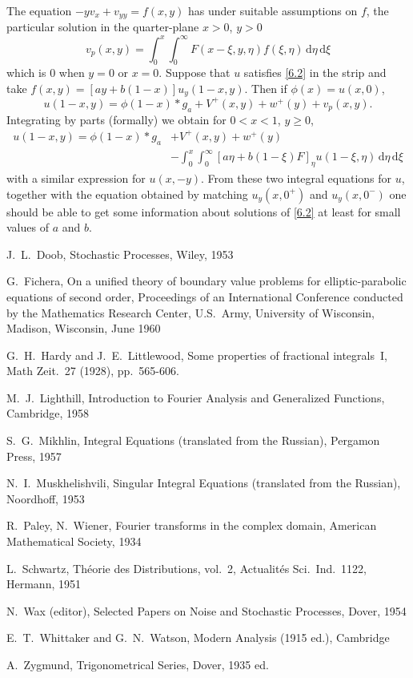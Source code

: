 \documentclass[leqno]{article}
\numberwithin{equation}{section}
\theoremstyle{plain}
\newcommand{\dd}{\,\mathrm{d}}
\begin{document}
The equation $-yv_x+v_{yy}=f(x,y)$ has under suitable assumptions on $f$, the particular solution in the quarter-plane $x > 0$, $y> 0$
\begin{equation*}
	v_p(x,y) = \int_0^x \int_0^\infty F(x-\xi,y,\eta) f(\xi,\eta) \dd \eta \dd \xi
\end{equation*}
which is $0$ when $y = 0$ or $x = 0$.
Suppose that $u$ satisfies \eqref{6.2} in the strip and take $f(x,y) = [ay + b(1-x)] u_y(1-x,y)$.
Then if $\phi(x)=u(x,0)$,
\begin{equation*}
	u(1-x,y) = \phi(1-x) * g_a + V^+(x,y) + w^+(y) + v_p(x,y).
\end{equation*}
Integrating by parts (formally) we obtain for $0 < x < 1$, $y \geq 0$,
\begin{equation*}
	\begin{split}
		u(1-x,y) = \phi(1-x) * g_a & + V^+(x,y) + w^+(y) \\
		& - \int_0^x \int_0^\infty [a\eta+b(1-\xi)F]_\eta u(1-\xi,\eta) \dd \eta \dd \xi
	\end{split}
\end{equation*}
with a similar expression for $u(x,-y)$.
From these two integral equations for $u$, together with the equation obtained by matching $u_y(x,0^+)$ and $u_y(x,0^-)$ one should be able to get some information about solutions of \eqref{6.2} at least for small values of $a$ and $b$.

\begin{thebibliography}{ZZZZ}
	J.\ L.\ Doob,
	Stochastic Processes,
	Wiley,
	1953
	
	G.\ Fichera,
	On a unified theory of boundary value problems for elliptic-parabolic equations of second order,
	Proceedings of an International Conference conducted by the Mathematics Research Center, 
	U.S.\ Army, University of Wisconsin, Madison, Wisconsin,
	June 1960
	
	G.\ H.\ Hardy and J.\ E.\ Littlewood, 
	Some properties of fractional integrals~I, 
	Math Zeit.\ 27 (1928), pp.\ 565-606.
	
	M.\ J.\ Lighthill, 
	Introduction to Fourier Analysis and Generalized Functions, 
	Cambridge,
	1958
	
	S.\ G.\ Mikhlin,
	Integral Equations (translated from the Russian),
	Pergamon Press, 
	1957
	
	N.\ I.\ Muskhelishvili,
	Singular Integral Equations (translated from the Russian),
	Noordhoff,
	1953
	
	R.\ Paley, N.\ Wiener,
	Fourier transforms in the complex domain,
	American Mathematical Society,
	1934

	L.\ Schwartz, Th\'eorie des Distributions, vol.\ 2, Actualit\'es Sci.\ Ind.\ 1122, Hermann, 1951

	N.\ Wax (editor),
	Selected Papers on Noise and Stochastic Processes,
	Dover, 
	1954
	
	E.\ T.\ Whittaker and G.\ N.\ Watson,
	Modern Analysis (1915 ed.),
	Cambridge
	
	A.\ Zygmund, 
	Trigonometrical Series,
	Dover,
	1935 ed.
\end{thebibliography}
\end{document}
